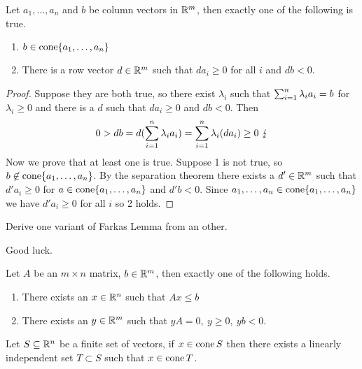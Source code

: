 \documentclass{exam}
\begin{document}
    \begin{theorem}
        Let $a_1,\dots ,a_n$ and $b$ be column vectors in $\mathbb{R}^m$, then exactly one of the following is true.
        \begin{enumerate}
            \item $b \in \operatorname{\mathop{cone}}\{a_1,\dots,a_n\}$
            \item There is a row vector $d \in \mathbb{R}^m$ such that $d a_i \ge 0$ for all $i$ and $db <0$.
        \end{enumerate}
    \end{theorem}
    \begin{proof}
        Suppose they are both true, so there exist $\lambda_i$ such that $\sum_{i=1}^n \lambda_i a_i = b$ for $\lambda_i \ge 0$ and there is a $d$ such that $d a_i \ge 0$ and $db <0$.
        Then
        \[
            0 > db = d (\sum_{i=1}^n \lambda_i a_i) = \sum_{i=1}^n \lambda_i (d a_i) \ge 0\ \lightning
        \]
        Now we prove that at least one is true.
        Suppose 1 is not true, so $b \not \in \operatorname{\mathop{cone}}\{a_1,\dots,a_n\}$.
        By the separation theorem there exists a $d' \in \mathbb{R}^m$ such that $d' a_i \ge 0$ for $a \in \operatorname{\mathop{cone}}\{a_1,\dots,a_n\}$ and $d'b <0$.
        Since $a_1,\dots,a_n \in \operatorname{\mathop{cone}}\{a_1,\dots,a_n\}$ we have $d' a_i \ge 0$ for all $i$ so 2 holds.
    \end{proof}
    \begin{question}
        Derive one variant of Farkas Lemma from an other.
    \end{question}
    \begin{answer}
        Good luck.
    \end{answer}
    \begin{theorem}
        Let $A$ be an $m \times n$ matrix, $b \in \mathbb{R}^m$, then exactly one of the following holds.
        \begin{enumerate}
            \item There exists an $x \in \mathbb{R}^n$ such that $Ax\le b$
            \item There exists an $y \in \mathbb{R}^m$ such that $yA=0,\ y\ge 0,\ yb<0$.
        \end{enumerate}
    \end{theorem}
    \begin{theorem}
        Let $S \subseteq \mathbb{R}^n$ be a finite set of vectors, if $x \in \operatorname{\mathop{cone}} S$ then there exists a linearly independent set $T \subset S$ such that $x \in \operatorname{\mathop{cone}} T$.
    \end{theorem}
\end{document}
